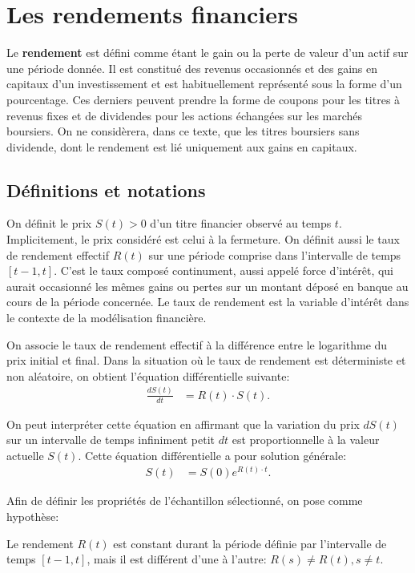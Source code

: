 \section{Les rendements financiers}
\label{sec:prixrendements}

Le \textbf{rendement} est défini comme étant le gain ou la perte de
valeur d'un actif sur une période donnée. Il est constitué des revenus
occasionnés et des gains en capitaux d'un investissement et est
habituellement représenté sous la forme d'un pourcentage. Ces derniers
peuvent prendre la forme de coupons pour les titres à revenus fixes et
de dividendes pour les actions échangées sur les marchés boursiers. On
ne considèrera, dans ce texte, que les titres boursiers sans
dividende, dont le rendement est lié uniquement aux gains en capitaux.

\subsection{Définitions et notations}
\label{sec:defrendements}

On définit le prix $S(t)>0$ d'un titre financier observé au temps
$t$. Implicitement, le prix considéré est celui à la fermeture. On
définit aussi le taux de rendement effectif $R(t)$ sur une période
comprise dans l'intervalle de temps $\left[t-1,t\right]$.  C'est le
taux composé continument, aussi appelé force d'intérêt, qui aurait
occasionné les mêmes gains ou pertes sur un montant déposé en banque
au cours de la période concernée. Le taux de rendement est la variable
d'intérêt dans le contexte de la modélisation financière.

On associe le taux de rendement effectif à la différence entre le
logarithme du prix initial et final. Dans la situation où le taux de
rendement est déterministe et non aléatoire, on obtient l'équation
différentielle suivante:
\begin{align*}
  \frac{dS(t)}{dt} &= R(t) \cdot S(t).
\end{align*}

On peut interpréter cette équation en affirmant que la variation du
prix $dS(t)$ sur un intervalle de temps infiniment petit $dt$ est
proportionnelle à la valeur actuelle $S(t)$. Cette équation
différentielle a pour solution générale:
\begin{align}
  \label{eq:solutiondiffrendement}
  S(t) &= S(0)e^{R(t) \cdot t}.
\end{align}

Afin de définir les propriétés de l'échantillon sélectionné, on pose
comme hypothèse:
\begin{hypothese}
  Le rendement $R(t)$ est constant durant la période définie par
  l'intervalle de temps $\left[t-1,t\right]$, mais il est différent
  d'une à l'autre: $R(s) \neq R(t), s \neq t$.
\end{hypothese}

